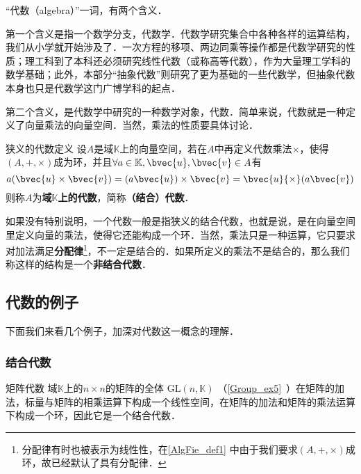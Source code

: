 

“代数（algebra）”一词，有两个含义．

第一个含义是指一个数学分支，代数学．代数学研究集合中各种各样的运算结构，我们从小学就开始涉及了．一次方程的移项、两边同乘等操作都是代数学研究的性质；理工科到了本科还必须研究线性代数（或称高等代数），作为大量理工学科的数学基础；此外，本部分“抽象代数”则研究了更为基础的一些代数学，但抽象代数本身也只是代数学这门广博学科的起点．

第二个含义，是代数学中研究的一种数学对象，代数．简单来说，代数就是一种定义了向量乘法的向量空间．当然，乘法的性质要具体讨论．



\begin{definition}{狭义的代数定义}\label{AlgFie_def1}
设$A$是域$\mathbb{K}$上的向量空间，若在$A$中再定义代数乘法$\times$，使得$(A,+,\times)$成为环，并且$\forall a\in \mathbb{K}, \bvec{u}, \bvec{v}\in A$有
\begin{equation}
a(\bvec{u} \times \bvec{v})=(a \bvec{u}) \times \bvec{v}=\bvec{u}{\times}(a \bvec{v})
\end{equation}
则称$A$为\textbf{域$\mathbb{K}$上的代数}，简称\textbf{（结合）代数}．

\end{definition}

如果没有特别说明，一个代数一般是指狭义的结合代数，也就是说，是在向量空间里定义向量的乘法，使得它还能构成一个环．当然，乘法只是一种运算，它只要求对加法满足\textbf{分配律}\footnote{分配律有时也被表示为线性性，在\autoref{AlgFie_def1} 中由于我们要求$(A, +, \times)$成环，故已经默认了具有分配律．}，不一定是结合的．如果所定义的乘法不是结合的，那么我们称这样的结构是一个\textbf{非结合代数}．


\subsection{代数的例子}
下面我们来看几个例子，加深对代数这一概念的理解．

\subsubsection{结合代数}

\begin{example}{矩阵代数}
域$\mathbb{K}$上的$n\times n$的矩阵的全体 $\mathrm{GL}(n, \mathbb{K})$ （\autoref{Group_ex5}~）在矩阵的加法，标量与矩阵的相乘运算下构成一个线性空间，在矩阵的加法和矩阵的乘法运算下构成一个环，因此它是一个结合代数．
\end{example}

